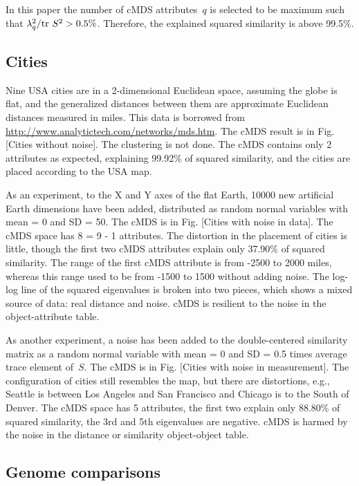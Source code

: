 \documentclass[10pt,a4paper]{article}
\begin{document}
In this paper the number of cMDS attributes~$q$ is selected to be maximum such that $\lambda_q^2 / \mathrm {tr} \  S^2 > 0.5\%$.
Therefore, the explained squared similarity is above 99.5\%.


\subsection{Cities}

Nine USA cities are in a 2-dimensional Euclidean space, assuming the globe is flat, 
and the generalized distances between them are approximate Euclidean distances measured in miles. 
This data is borrowed from \url{http://www.analytictech.com/networks/mds.htm}. 
The cMDS result is in Fig. [Cities without noise]. 
The clustering is not done. The cMDS contains only 2 attributes as expected, explaining 99.92\% of squared similarity, 
and the cities are placed according to the USA map. 

As an experiment, to the X and Y axes of the flat Earth, 10000 new artificial Earth dimensions have been added, 
distributed as random normal variables with mean = 0 and SD = 50. 
The cMDS is in Fig. [Cities with noise in data]. 
The cMDS space has 8 = 9 - 1 attributes. 
The distortion in the placement of cities is little, though the first two cMDS attributes explain only 37.90\% of squared similarity.
The range of the first cMDS attribute is from -2500 to 2000 miles, 
whereas this range used to be from -1500 to 1500 without adding noise. 
The log-log line of the squared eigenvalues is broken into two pieces, which shows a mixed source of data: real distance and noise. 
cMDS is resilient to the noise in the object-attribute table.

As another experiment, 
a noise has been added to the double-centered similarity matrix as a random normal variable 
with mean = 0 and SD = 0.5 times average trace element of~$S$. 
The cMDS is in Fig. [Cities with noise in measurement]. 
The configuration of cities still resembles the map, but there are distortions,
e.g., Seattle is between Los Angeles and San Francisco and Chicago is to the South of Denver. 
The cMDS space has 5 attributes, the first two explain only 88.80\% of squared similarity, 
the 3rd and 5th eigenvalues are negative. 
cMDS is harmed by the noise in the distance or similarity object-object table.


\subsection{Genome comparisons}
\end{document}
